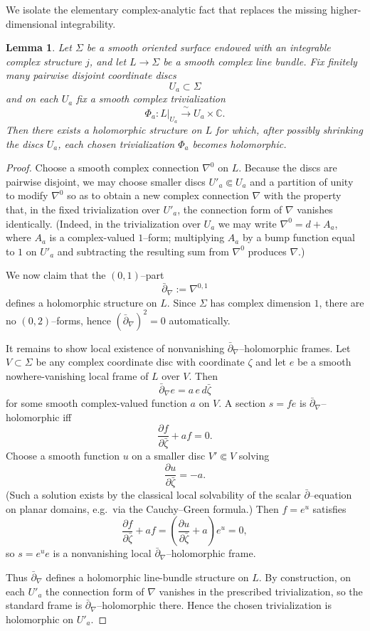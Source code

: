 \documentclass[11pt]{article}
\newtheorem{lemma}[theorem]{Lemma}
\theoremstyle{remark}
\newcommand{\CC}{\mathbb{C}}
\begin{document}
We isolate the elementary complex-analytic fact that replaces the missing
higher-dimensional integrability.

\begin{lemma}\label{lem:holomorphic_line_bundle}
Let $\Sigma$ be a smooth oriented surface endowed with an integrable complex
structure $j$, and let $L\to\Sigma$ be a smooth complex line bundle.
Fix finitely many pairwise disjoint coordinate discs
\[
U_a\subset \Sigma
\]
and on each $U_a$ fix a smooth complex trivialization
\[
\Phi_a\colon L|_{U_a}\xrightarrow{\;\sim\;} U_a\times \CC.
\]
Then there exists a holomorphic structure on $L$ for which, after possibly shrinking
the discs $U_a$, each chosen trivialization $\Phi_a$ becomes holomorphic.
\end{lemma}

\begin{proof}
Choose a smooth complex connection $\nabla^0$ on $L$.
Because the discs are pairwise disjoint, we may choose smaller discs
$U'_a\Subset U_a$ and a partition of unity to modify $\nabla^0$ so as to obtain a
new complex connection $\nabla$ with the property that, in the fixed trivialization
over $U'_a$, the connection form of $\nabla$ vanishes identically.
(Indeed, in the trivialization over $U_a$ we may write
$\nabla^0=d+A_a$, where $A_a$ is a complex-valued $1$--form; multiplying $A_a$
by a bump function equal to $1$ on $U'_a$ and subtracting the resulting sum from
$\nabla^0$ produces $\nabla$.)

We now claim that the $(0,1)$--part
\[
\bar\partial_\nabla := \nabla^{0,1}
\]
defines a holomorphic structure on $L$.
Since $\Sigma$ has complex dimension $1$, there are no $(0,2)$--forms, hence
$(\bar\partial_\nabla)^2=0$ automatically.

It remains to show local existence of nonvanishing $\bar\partial_\nabla$--holomorphic
frames.
Let $V\subset\Sigma$ be any complex coordinate disc with coordinate $\zeta$ and
let $e$ be a smooth nowhere-vanishing local frame of $L$ over $V$.
Then
\[
\bar\partial_\nabla e = a\, e\, d\bar\zeta
\]
for some smooth complex-valued function $a$ on $V$.
A section $s=f e$ is $\bar\partial_\nabla$--holomorphic iff
\[
\frac{\partial f}{\partial\bar\zeta}+a f=0.
\]
Choose a smooth function $u$ on a smaller disc $V'\Subset V$ solving
\[
\frac{\partial u}{\partial\bar\zeta}=-a.
\]
(Such a solution exists by the classical local solvability of the scalar
$\bar\partial$--equation on planar domains, e.g.\ via the Cauchy--Green formula.)
Then $f=e^u$ satisfies
\[
\frac{\partial f}{\partial\bar\zeta}+af
=
\left(\frac{\partial u}{\partial\bar\zeta}+a\right)e^u=0,
\]
so $s=e^u e$ is a nonvanishing local $\bar\partial_\nabla$--holomorphic frame.

Thus $\bar\partial_\nabla$ defines a holomorphic line-bundle structure on $L$.
By construction, on each $U'_a$ the connection form of $\nabla$ vanishes in the
prescribed trivialization, so the standard frame is $\bar\partial_\nabla$--holomorphic
there.  Hence the chosen trivialization is holomorphic on $U'_a$.
\end{proof}
\end{document}
